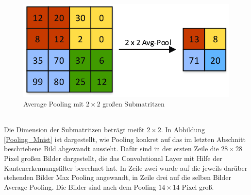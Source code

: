 \documentclass{article}
\begin{document}
\begin{figure}[h]
	\centering
	\includegraphics[width=0.7\linewidth]{../graphics/Average-Pooling-Example.png}
	\caption[Average Pooling mit $2\times2$ großen Submatritzen\newline
	Aus: Dominguez-Morales, Juan Pedro. (2018). Neuromorphic audio processing through real-time embedded spiking neural networks. Abbildung 33]{Average Pooling mit $2\times2$ großen Submatritzen}
	\label{AvgPool}
\end{figure}
\\
Die Dimension der Submatritzen beträgt meißt $2\times2$. In Abbildung \ref{Pooling_Mnist} ist dargestellt, wie Pooling konkret auf das im letzten Abschnitt beschriebene Bild abgewandt aussieht. Dafür sind in der ersten Zeile die $28\times28$ Pixel großen Bilder dargestellt, die das Convolutional Layer mit Hilfe der Kantenerkennungsfilter berechnet hat. In Zeile zwei wurde auf die jeweils darüber stehenden Bilder Max Pooling angewandt, in Zeile drei auf die selben Bilder Average Pooling. Die Bilder sind nach dem Pooling $14\times14$ Pixel groß.
\end{document}
